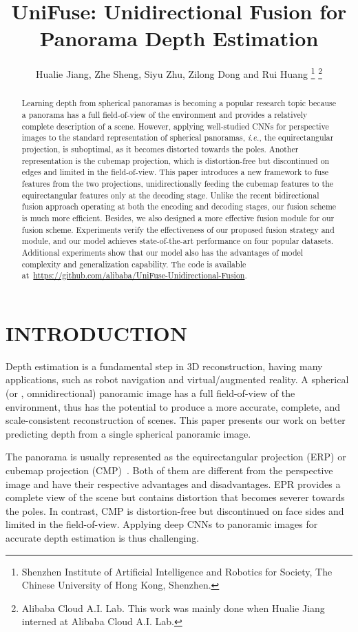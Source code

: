 \documentclass[letterpaper, 10 pt, conference]{ieeeconf}
\title{\LARGE \bf
UniFuse: Unidirectional Fusion for \boldmath Panorama Depth Estimation}
\author{Hualie Jiang, Zhe Sheng, Siyu Zhu, Zilong Dong and Rui Huang 
\thanks{Shenzhen Institute of Artificial Intelligence and Robotics for Society, The Chinese University of Hong Kong, Shenzhen.}
\thanks{Alibaba Cloud A.I. Lab. This work was mainly done when Hualie Jiang interned at Alibaba Cloud A.I. Lab.}
}
\def\ie{\emph{i.e.}}
\begin{document}
\maketitle
\thispagestyle{empty}
\pagestyle{empty}


\begin{abstract}
Learning depth from spherical panoramas is becoming a popular research topic because a panorama has a full field-of-view of the environment and provides a relatively complete description of a scene. However, applying well-studied CNNs for perspective images to the standard representation of spherical panoramas, \ie, the equirectangular projection, is suboptimal, as it becomes distorted towards the poles. Another representation is the cubemap projection, which is distortion-free but discontinued on edges and limited in the field-of-view. This paper introduces a new framework to fuse features from the two projections, unidirectionally feeding the cubemap features to the equirectangular features only at the decoding stage. Unlike the recent bidirectional fusion approach operating at both the encoding and decoding stages, our fusion scheme is much more efficient. Besides, we also designed a more effective fusion module for our fusion scheme. Experiments verify the effectiveness of our proposed fusion strategy and module, and our model achieves state-of-the-art performance on four popular datasets. Additional experiments show that our model also has the advantages of model complexity and generalization capability. The code is available at~\url{https://github.com/alibaba/UniFuse-Unidirectional-Fusion}. 
\end{abstract}




\section{INTRODUCTION}

Depth estimation is a fundamental step in 3D reconstruction, having many applications, such as robot navigation and virtual/augmented reality.  
A spherical (or , omnidirectional) panoramic image has a full field-of-view of the environment, thus has the potential to produce a more accurate, complete, and scale-consistent reconstruction of scenes.
This paper presents our work on better predicting depth from a single spherical panoramic image. 

The  panorama is usually represented as the equirectangular projection (ERP) or cubemap projection (CMP)~\cite{skupin2017standardization}. Both of them are different from the perspective image and have their respective advantages and disadvantages. 
EPR provides a complete view of the scene but contains distortion that becomes severer towards the poles. In contrast, CMP is distortion-free but discontinued on face sides and limited in the field-of-view.
Applying deep CNNs to panoramic images for accurate depth estimation is thus challenging. 
\end{document}
